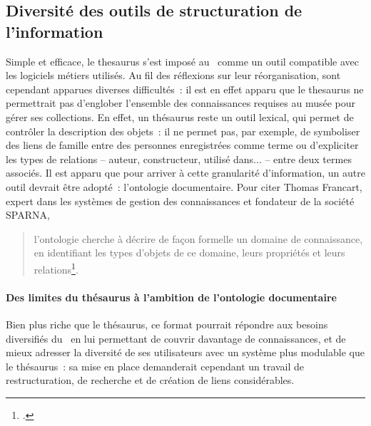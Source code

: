 \subsection{Diversité des outils de structuration de l’information}


Simple et efficace, le \gls{thesaurus} s'est imposé au \mae~comme un outil compatible avec les logiciels métiers utilisés. Au fil des réflexions sur leur réorganisation, sont cependant apparues diverses difficultés~: il est en effet apparu que le \gls{thesaurus} ne permettrait pas d'englober l'ensemble des connaissances requises au musée pour gérer ses collections. En effet, un thésaurus reste un outil lexical, qui permet de contrôler la description des objets~: il ne permet pas, par exemple, de symboliser des liens de famille entre des personnes enregistrées comme terme ou d'expliciter les types de relations -- auteur, constructeur, utilisé dans... -- entre deux termes associés.
Il est apparu que pour arriver à cette granularité d'information, un autre outil devrait être adopté~: l'ontologie documentaire. Pour citer Thomas Francart, expert dans les systèmes de gestion des connaissances et fondateur de la société SPARNA, \blockquote{l’ontologie cherche à décrire de façon formelle un domaine de connaissance, en identifiant les types d’objets de ce domaine, leurs propriétés et leurs relations\footcite{francartOntologieThesaurusTaxonomie2013}.}

\paragraph*{Des limites du thésaurus à l’ambition de l’ontologie documentaire}

Bien plus riche que le thésaurus, ce format pourrait répondre aux besoins diversifiés du \mae~en lui permettant de couvrir davantage de connaissances, et de mieux adresser la diversité de ses utilisateurs avec un système plus modulable que le thésaurus~: sa mise en place demanderait cependant un travail de restructuration, de recherche et de création de liens considérables.

